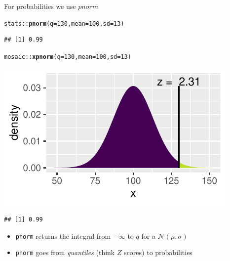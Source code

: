 \documentclass[10pt,handout]{beamer}\usepackage[]{graphicx}\usepackage[]{color}
\makeatletter
\newcommand{\hlnum}[1]{\textcolor[rgb]{0.686,0.059,0.569}{#1}}%
\newcommand{\hlopt}[1]{\textcolor[rgb]{0,0,0}{#1}}%
\newcommand{\hlstd}[1]{\textcolor[rgb]{0.345,0.345,0.345}{#1}}%
\newcommand{\hlkwc}[1]{\textcolor[rgb]{0.333,0.667,0.333}{#1}}%
\newcommand{\hlkwd}[1]{\textcolor[rgb]{0.737,0.353,0.396}{\textbf{#1}}}%
\newenvironment{kframe}{%
 \def\at@end@of@kframe{}%
 \ifinner\ifhmode%
  \def\at@end@of@kframe{\end{minipage}}%
  \begin{minipage}{\columnwidth}%
 \fi\fi%
 \def\FrameCommand##1{\hskip\@totalleftmargin \hskip-\fboxsep
 \colorbox{shadecolor}{##1}\hskip-\fboxsep
     \hskip-\linewidth \hskip-\@totalleftmargin \hskip\columnwidth}%
 \MakeFramed {\advance\hsize-\width
   \@totalleftmargin\z@ \linewidth\hsize
   \@setminipage}}%
 {\par\unskip\endMakeFramed%
 \at@end@of@kframe}
\newenvironment{knitrout}{}{} %
\makeatother
\begin{document}
\begin{frame}[fragile]{For probabilities we use $pnorm$}
	
	
\begin{knitrout}\tiny
{}\color{fgcolor}\begin{kframe}
\begin{alltt}
\hlstd{stats}\hlopt{::}\hlkwd{pnorm}\hlstd{(}\hlkwc{q} \hlstd{=} \hlnum{130}\hlstd{,} \hlkwc{mean} \hlstd{=} \hlnum{100}\hlstd{,} \hlkwc{sd} \hlstd{=} \hlnum{13}\hlstd{)}
\end{alltt}
\begin{verbatim}
## [1] 0.99
\end{verbatim}
\end{kframe}
\end{knitrout}
	
	\pause 
	
\begin{knitrout}\tiny
{}\color{fgcolor}\begin{kframe}
\begin{alltt}
\hlstd{mosaic}\hlopt{::}\hlkwd{xpnorm}\hlstd{(}\hlkwc{q} \hlstd{=} \hlnum{130}\hlstd{,} \hlkwc{mean} \hlstd{=} \hlnum{100}\hlstd{,} \hlkwc{sd} \hlstd{=} \hlnum{13}\hlstd{)}
\end{alltt}
\end{kframe}

{\centering \includegraphics[width=0.6\linewidth]{figure/probs3-1} 

}


\begin{kframe}\begin{verbatim}
## [1] 0.99
\end{verbatim}
\end{kframe}
\end{knitrout}
	
	\pause 
	
	\begin{itemize}
		\item \texttt{pnorm} returns the integral from $-\infty$ to $q$ for a $\mathcal{N}(\mu, \sigma)$
		\item \texttt{pnorm} goes from \textit{quantiles} (think $Z$ scores) to probabilities
	\end{itemize}
	
\end{frame}
\end{document}
